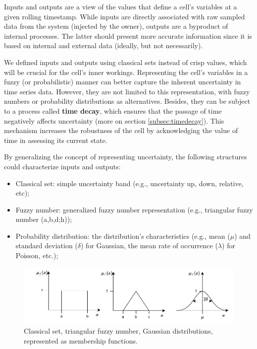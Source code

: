 Inputs and outputs are a view of the values that define a cell's variables at a given rolling timestamp. While inputs are directly associated with raw sampled data from the system (injected by the owner), outputs are a byproduct of internal processes. The latter should present more accurate information since it is based on internal and external data (ideally, but not necessarily).

We defined inputs and outputs using classical sets instead of crisp values, which will be crucial for the cell's inner workings. Representing the cell's variables in a fuzzy (or probabilistic) manner can better capture the inherent uncertainty in time series data. However, they are not limited to this representation, with fuzzy numbers or probability distributions as alternatives. Besides, they can be subject to a process called \textbf{time decay}, which ensures that the passage of time negatively affects uncertainty (more on section \ref{subsec:timedecay}). This mechanism increases the robustness of the cell by acknowledging the value of time in assessing its current state.

By generalizing the concept of representing uncertainty, the following structures could characterize inputs and outputs:

\begin{itemize}
    \item Classical set: simple uncertainty band (e.g., uncertainty up, down, relative, etc);
    \item Fuzzy number: generalized fuzzy number representation \cite{Zhang2019} (e.g., triangular fuzzy number (a,b,d;h));
    \item Probability distribution: the distribution's characteristics (e.g., mean ($\mu$) and standard deviation ($\delta$) for Gaussian, the mean rate of occurrence ($\lambda$) for Poisson, etc.);
\end{itemize}

\begin{figure}[h!]
    \centering
    \includegraphics[width=15cm]{figures/chapter4/cell/classic_fuzzy_gaussian.pdf}
    \caption{Classical set, triangular fuzzy number, Gaussian distributions, represented as membership functions.}
    \label{fig:classicfuzzygaussian}
\end{figure}

